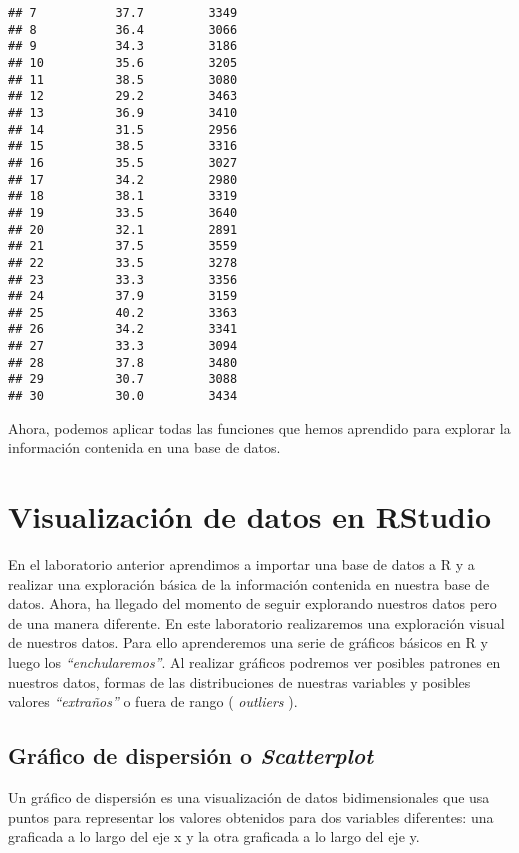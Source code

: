 \documentclass[]{book}
\begin{document}
\begin{verbatim}
## 7           37.7         3349
## 8           36.4         3066
## 9           34.3         3186
## 10          35.6         3205
## 11          38.5         3080
## 12          29.2         3463
## 13          36.9         3410
## 14          31.5         2956
## 15          38.5         3316
## 16          35.5         3027
## 17          34.2         2980
## 18          38.1         3319
## 19          33.5         3640
## 20          32.1         2891
## 21          37.5         3559
## 22          33.5         3278
## 23          33.3         3356
## 24          37.9         3159
## 25          40.2         3363
## 26          34.2         3341
## 27          33.3         3094
## 28          37.8         3480
## 29          30.7         3088
## 30          30.0         3434
\end{verbatim}

Ahora, podemos aplicar todas las funciones que hemos aprendido para explorar la información contenida en
una base de datos.

\hypertarget{visualizacion-de-datos-en-rstudio}{%
\chapter{Visualización de datos en RStudio}\label{visualizacion-de-datos-en-rstudio}}

En el laboratorio anterior aprendimos a importar una base de datos a R y a realizar una exploración básica de
la información contenida en nuestra base de datos. Ahora, ha llegado del momento de seguir explorando
nuestros datos pero de una manera diferente. En este laboratorio realizaremos una exploración visual de
nuestros datos. Para ello aprenderemos una serie de gráficos básicos en R y luego los \emph{``enchularemos''}. Al
realizar gráficos podremos ver posibles patrones en nuestros datos, formas de las distribuciones de nuestras
variables y posibles valores \emph{``extraños''} o fuera de rango ( \emph{outliers} ).

\hypertarget{grafico-de-dispersion-o-scatterplot}{%
\section{\texorpdfstring{Gráfico de dispersión o \emph{Scatterplot}}{Gráfico de dispersión o Scatterplot}}\label{grafico-de-dispersion-o-scatterplot}}

Un gráfico de dispersión es una visualización de datos bidimensionales que usa puntos para representar los
valores obtenidos para dos variables diferentes: una graficada a lo largo del eje x y la otra graficada a lo
largo del eje y.
\end{document}
